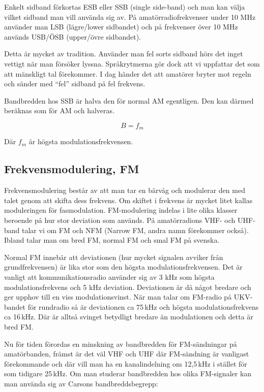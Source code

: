 Enkelt sidband förkortas ESB eller SSB (single side-band) och man kan välja
vilket sidband man vill använda sig av. På amatörradiofrekvenser under 10 MHz
använder man LSB (lägre/lower sidbandet) och på frekvenser över 10 MHz används
USB/ÖSB (upper/övre sidbandet).

Detta är mycket av tradition. Använder man fel sorts sidband hörs det inget
vettigt när man försöker lyssna. Språkrytmerna gör dock att vi uppfattar det
som att mänskligt tal förekommer. I dag händer det att amatörer bryter mot
regeln och sänder med ``fel'' sidband på fel frekvens.

Bandbredden hos SSB är halva den för normal AM egentligen. Den kan därmed
beräknas som för AM och halveras.

\begin{equation}
	B=f_m
\end{equation}

Där $f_m$ är högsta modulationsfrekvensen.

\subsection{Frekvensmodulering, FM}

Frekvensmodulering består av att man tar en bärvåg och modulerar den med talet
genom att skifta dess frekvens. Om skiftet i frekvens är mycket litet kallas
moduleringen för fasmodulation. FM-modulering indelas i lite olika klasser
beroende på hur stor deviation som används. På amatörradions VHF- och UHF-band
talar vi om FM och NFM (Narrow FM, andra namn förekommer också). Ibland talar
man om bred FM, normal FM och smal FM på svenska.

Normal FM innebär att deviationen (hur mycket signalen avviker från
grundfrekvensen) är lika stor som den högsta modulationsfrekvensen. Det är
vanligt att kommunikationsradio använder sig av 3 kHz som högsta
modulationsfrekvens och 5 kHz deviation. Deviationen är då något bredare och ger
upphov till en viss modulationsvinst. När man talar om FM-radio på UKV-bandet
för rundradio så är deviationen ca 75\,kHz och högsta modulationsfrekvens ca
16\,kHz. Där är alltså svinget betydligt bredare än modulationen och detta är
bred FM.

Nu för tiden förordas en minskning av bandbredden för FM-sändningar på
amatörbanden, främst är det väl VHF och UHF där FM-sändning är vanligast
förekommande och där vill man ha en kanalindelning om 12,5\,kHz i stället för
som tidigare 25\,kHz. Om man studerar bandbredden hos olika FM-signaler kan
man använda sig av Carsons bandbreddsbegrepp:

